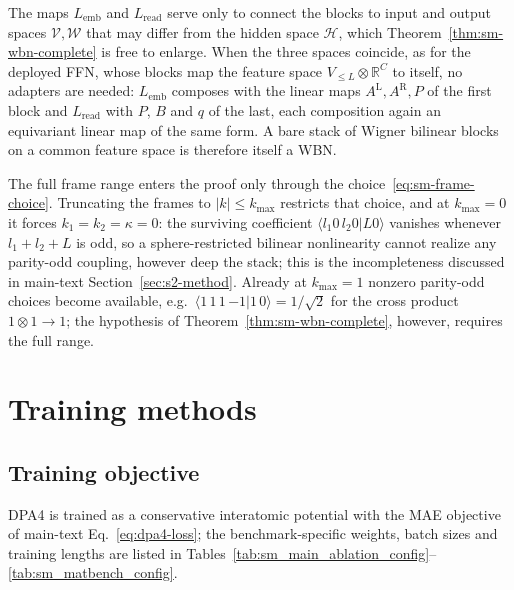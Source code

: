 \begin{remark}
\label{rem:sm-wbn-adapters}
The maps $L_{\mathrm{emb}}$ and $L_{\mathrm{read}}$ serve only to connect the blocks to input and output spaces $\mathcal{V},\mathcal{W}$ that may differ from the hidden space $\mathcal{H}$, which Theorem~\ref{thm:sm-wbn-complete} is free to enlarge.
When the three spaces coincide, as for the deployed FFN, whose blocks map the feature space $V_{\le L}\otimes\mathbb{R}^{C}$ to itself, no adapters are needed: $L_{\mathrm{emb}}$ composes with the linear maps $A^{\mathrm{L}},A^{\mathrm{R}},P$ of the first block and $L_{\mathrm{read}}$ with $P$, $B$ and $q$ of the last, each composition again an equivariant linear map of the same form.
A bare stack of Wigner bilinear blocks on a common feature space is therefore itself a WBN.
\end{remark}

\begin{remark}
    \label{rem:sm-wbn-truncation}
    The full frame range enters the proof only through the choice~\eqref{eq:sm-frame-choice}.
    Truncating the frames to $|k|\le k_{\max}$ restricts that choice, and at $k_{\max}=0$ it forces $k_1=k_2=\kappa=0$: the surviving coefficient $\langle l_1 0\, l_2 0|L 0\rangle$ vanishes whenever $l_1+l_2+L$ is odd, so a sphere-restricted bilinear nonlinearity cannot realize any parity-odd coupling, however deep the stack; this is the incompleteness discussed in main-text Section~\ref{sec:s2-method}.
    Already at $k_{\max}=1$ nonzero parity-odd choices become available, e.g.\ $\langle 1\,1\,1\,{-1}|1\,0\rangle=1/\sqrt{2}$ for the cross product $1\otimes1\to1$; the hypothesis of Theorem~\ref{thm:sm-wbn-complete}, however, requires the full range.
\end{remark}

\FloatBarrier
\section{Training methods}
\label{sec:sm-training-systems}

\subsection{Training objective}
\label{sec:sm-training-objective}

DPA4 is trained as a conservative interatomic potential with the MAE objective of main-text Eq.~\eqref{eq:dpa4-loss}; the benchmark-specific weights, batch sizes and training lengths are listed in Tables~\ref{tab:sm_main_ablation_config}--\ref{tab:sm_matbench_config}.

